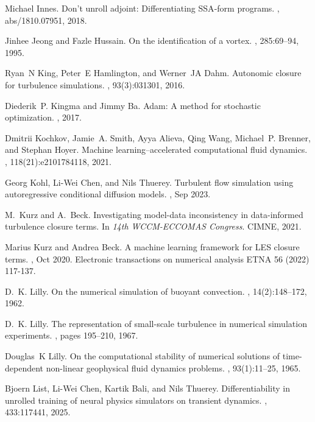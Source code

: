 \documentclass[preprint]{elsarticle}
\begin{document}
\begin{thebibliography}{10}
Michael Innes.
\newblock Don't unroll adjoint: Differentiating {SSA}-form programs.
, abs/1810.07951, 2018.

Jinhee Jeong and Fazle Hussain.
\newblock On the identification of a vortex.
, 285:69–94, 1995.

Ryan~N King, Peter~E Hamlington, and Werner~JA Dahm.
\newblock Autonomic closure for turbulence simulations.
, 93(3):031301, 2016.

Diederik~P. Kingma and Jimmy Ba.
\newblock Adam: A method for stochastic optimization.
, 2017.

Dmitrii Kochkov, Jamie~A. Smith, Ayya Alieva, Qing Wang, Michael~P. Brenner, and Stephan Hoyer.
\newblock Machine learning–accelerated computational fluid dynamics.
, 118(21):e2101784118, 2021.

Georg Kohl, Li-Wei Chen, and Nils Thuerey.
\newblock Turbulent flow simulation using autoregressive conditional diffusion models.
, Sep 2023.

M.~Kurz and A.~Beck.
\newblock Investigating model-data inconsistency in data-informed turbulence closure terms.
\newblock In {\em 14th {WCCM}-{ECCOMAS} Congress}. {CIMNE}, 2021.

Marius Kurz and Andrea Beck.
\newblock A machine learning framework for {LES} closure terms.
, Oct 2020.
\newblock Electronic transactions on numerical analysis ETNA 56 (2022) 117-137.

D.~K. Lilly.
\newblock On the numerical simulation of buoyant convection.
, 14(2):148--172, 1962.

D.~K. Lilly.
\newblock The representation of small-scale turbulence in numerical simulation experiments.
, pages 195--210, 1967.

Douglas~K Lilly.
\newblock On the computational stability of numerical solutions of time-dependent non-linear geophysical fluid dynamics problems.
, 93(1):11--25, 1965.

Bjoern List, Li-Wei Chen, Kartik Bali, and Nils Thuerey.
\newblock Differentiability in unrolled training of neural physics simulators on transient dynamics.
, 433:117441, 2025.


\end{thebibliography}
\end{document}

